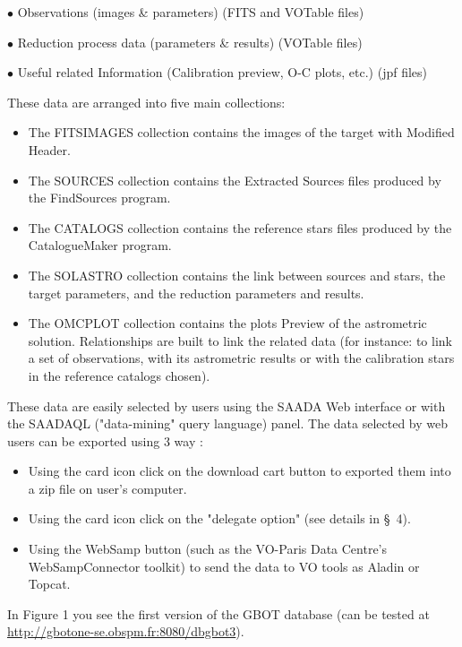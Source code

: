 $\bullet$ Observations (images \& parameters) (FITS and VOTable files)

$\bullet$ Reduction process data (parameters \& results) (VOTable files)

$\bullet$ Useful related Information (Calibration preview, O-C plots, etc.) (jpf files)
\newpage

\noindent These data are arranged into five main collections: 

\begin{itemize}
\item The FITSIMAGES collection contains the images of the target with Modified Header.
\item The SOURCES collection contains the Extracted Sources files produced by the FindSources program.
\item The CATALOGS collection contains the reference stars files produced by the CatalogueMaker program.
\item The SOLASTRO collection contains the link between sources and stars, the target parameters, and the reduction parameters and results.
\item The OMCPLOT collection contains the plots Preview of the astrometric solution. Relationships are built to link the related data (for instance: to link a set of observations, with its astrometric results or with the calibration stars in the reference catalogs chosen).
\end{itemize}

These data are easily selected by users using the SAADA Web interface  or with the SAADAQL ("data-mining" query language) panel. The data selected by web users can be exported using 3 way :
\begin{itemize}
\item Using the card icon click on the download cart button to exported them into a zip file on user's computer.
\item Using the card icon click on the "delegate option" (see details in \S~4).
\item Using the WebSamp button (such as the VO-Paris Data Centre's WebSampConnector toolkit) to send the data to VO tools as Aladin or Topcat.
\end{itemize}
In Figure 1 you see the  first version of the GBOT database (can be tested at \url{http://gbotone-se.obspm.fr:8080/dbgbot3}).

